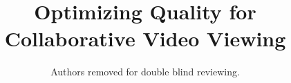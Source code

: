 \documentclass{sig-alternate}
\begin{document}
%


\title{Optimizing Quality for Collaborative Video Viewing}
% 
%
%

\author{
 \alignauthor Authors removed for double blind reviewing.
} 

%

\end{document}
